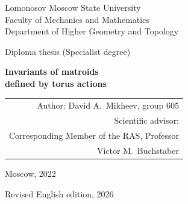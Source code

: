 \documentclass[11pt,a4paper]{article}
\numberwithin{equation}{section}
\theoremstyle{plain}
\theoremstyle{definition}
\theoremstyle{remark}
\newcommand{\C}{\mathbb{C}}
\newcommand{\HT}{H^{*}_{T}}
\DeclareMathOperator{\Fl}{Fl}
\begin{document}
\begin{titlepage}
\centering
{\large Lomonosov Moscow State University\\
Faculty of Mechanics and Mathematics\\
Department of Higher Geometry and Topology\par}
\vspace{3cm}
{\large Diploma thesis (Specialist degree)\par}
\vspace{1.2cm}
{\LARGE\bfseries Invariants of matroids\\[4pt] defined by torus actions\par}
\vspace{3cm}
\begin{flushright}
\begin{tabular}{r}
Author: David A.~Mikheev, group 605\\[10pt]
Scientific advisor:\\
Corresponding Member of the RAS, Professor\\
Victor M.~Buchstaber
\end{tabular}
\end{flushright}
\vfill
{\large Moscow, 2022\par}
\vspace{4pt}
{\normalsize Revised English edition, 2026\par}
\end{titlepage}

\begin{abstract}
We study the combinatorics of the face poset $S(X)$ of an action of a compact torus $T$ of positive complexity on a manifold~$X$. The aim is to investigate connections between known constructions in matroid theory, toric geometry and toric topology. We prove that the local equivariant cohomology $\HT(X,X\setminus pt)$ at a fixed point $pt$, viewed through restriction to $pt$ as an ideal of $\HT(pt)$, is the principal ideal generated by the product of the tangent weights at $pt$; it therefore determines the linear matroid of weights at $pt$, multiplicities included, and hence the geometric lattice $S(X)_{\geqslant pt}$ of faces whose closures contain $pt$. As a counterpoint, we show that this local data is far from determining the global equivariant cohomology: we exhibit two connected regular semisimple Hessenberg varieties in $\Fl(\C^5)$, with torus actions of complexity one, whose local weight matroids are isomorphic at every fixed point --- so that the Chow rings and Orlik--Solomon algebras of these matroids coincide --- while their equivariant cohomology modules are not isomorphic.
\end{abstract}
\end{document}
